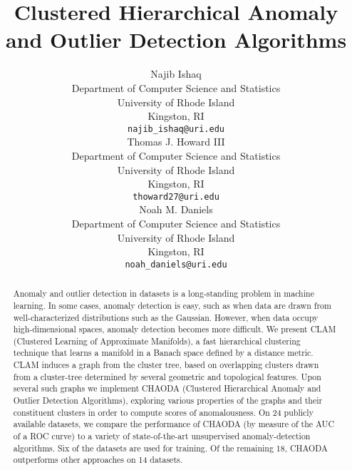 \documentclass{article}
\title{Clustered Hierarchical Anomaly and Outlier Detection Algorithms}
\author{
    Najib Ishaq \\
    Department of Computer Science and Statistics\\
    University of Rhode Island\\
    Kingston, RI\\
    \texttt{najib\_ishaq@uri.edu} \\
    \And
    Thomas J. Howard III \\
    Department of Computer Science and Statistics\\
    University of Rhode Island\\
    Kingston, RI\\
    \texttt{thoward27@uri.edu} \\
    \AND
    Noah M. Daniels \\
    Department of Computer Science and Statistics\\
    University of Rhode Island\\
    Kingston, RI\\
    \texttt{noah\_daniels@uri.edu} \\
}
\begin{document}
    \maketitle

    \begin{abstract}
        Anomaly and outlier detection in datasets is a long-standing problem in machine learning.
        In some cases, anomaly detection is easy, such as when data are drawn from well-characterized distributions such as the Gaussian.
        However, when data occupy high-dimensional spaces, anomaly detection becomes more difficult.
        We present CLAM (Clustered Learning of Approximate Manifolds), a fast hierarchical clustering technique that learns a manifold in a Banach space defined by a distance metric.
        CLAM induces a graph from the cluster tree, based on overlapping clusters drawn from a cluster-tree determined by several geometric and topological features.
        Upon several such graphs we implement CHAODA (Clustered Hierarchical Anomaly and Outlier Detection Algorithms), exploring various properties of the graphs and their constituent clusters in order to compute scores of anomalousness.
        On 24 publicly available datasets, we compare the performance of CHAODA (by measure of the AUC of a ROC curve) to a variety of state-of-the-art unsupervised anomaly-detection algorithms.
        Six of the datasets are used for training.
        Of the remaining 18, CHAODA outperforms other approaches on 14 datasets.
    \end{abstract}

    
    
    
    
    

    
    
\end{document}
